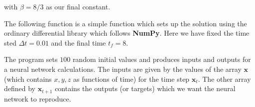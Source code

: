 \documentclass[%
oneside,                 %
final,                   %
10pt]{article}
\begin{document}
with $\beta=8/3$ as our final constant.

The following function is a
simple function which sets up the solution using the ordinary
differential library which follows \textbf{NumPy}. Here we have fixed the
time sted $\Delta t=0.01$ and the final time $t_f=8$.

The program sets $100$ random initial values and produces inputs and outputs for a neural network calculations.
The inputs are given by the values of the array $\bm{x}$ (which contains $x,y,z$ as functions of time) for the time step $\bm{x}_t$.
The other array defined by $\bm{x}_{t+1}$ contains the outputs (or targets) which we want the neural network to reproduce.
\end{document}
